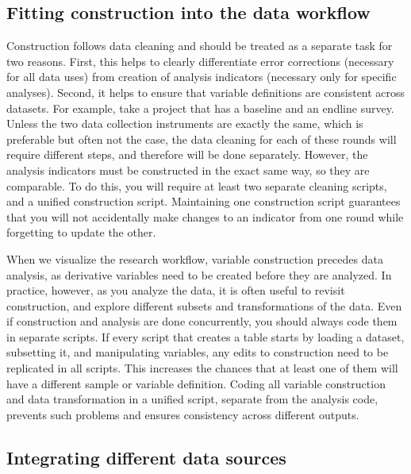 \subsection{Fitting construction into the data workflow}

Construction follows data cleaning and
should be treated as a separate task for two reasons.
First, this helps to clearly differentiate error corrections
(necessary for all data uses)
from creation of analysis indicators
(necessary only for specific analyses).
Second, it helps to ensure that variable definitions are
consistent across datasets.
For example, take a project that has a baseline and an endline survey.
Unless the two data collection instruments are exactly the same,
which is preferable but often not the case,
the data cleaning for each of these rounds will require different steps,
and therefore will be done separately.
However, the analysis indicators must be constructed in the exact same way,
so they are comparable.
To do this, you will require at least two separate cleaning scripts,
and a unified construction script.
Maintaining one construction script guarantees that you will not
accidentally make changes to an indicator from one round
while forgetting to update the other.

When we visualize the research workflow,
variable construction precedes data analysis,
as derivative variables need to be created before they are analyzed.
In practice, however, as you analyze the data,
it is often useful to revisit construction,
and explore different subsets and transformations of the data.
Even if construction and analysis are done concurrently,
you should always code them in separate scripts.
If every script that creates a table starts by loading a dataset,
subsetting it, and manipulating variables,
any edits to construction need to be replicated in all scripts.
This increases the chances that at least one of them
will have a different sample or variable definition.
Coding all variable construction and data transformation
in a unified script, separate from the analysis code,
prevents such problems and ensures consistency across different outputs.

\subsection{Integrating different data sources}

